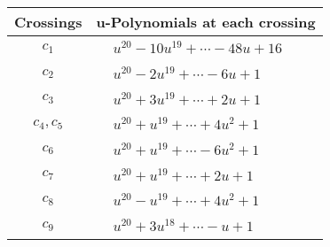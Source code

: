 \documentclass[1p]{elsarticle_modified}
\theoremstyle{definition}
\begin{document}
\begin{tabular}{m{50pt}|m{274pt}}
Crossings & \hspace{64pt}u-Polynomials at each crossing \\
\hline $$\begin{aligned}c_{1}\end{aligned}$$&$\begin{aligned}
&u^{20}-10 u^{19}+\cdots-48 u+16
\end{aligned}$\\
\hline $$\begin{aligned}c_{2}\end{aligned}$$&$\begin{aligned}
&u^{20}-2 u^{19}+\cdots-6 u+1
\end{aligned}$\\
\hline $$\begin{aligned}c_{3}\end{aligned}$$&$\begin{aligned}
&u^{20}+3 u^{19}+\cdots+2 u+1
\end{aligned}$\\
\hline $$\begin{aligned}c_{4},c_{5}\end{aligned}$$&$\begin{aligned}
&u^{20}+u^{19}+\cdots+4 u^2+1
\end{aligned}$\\
\hline $$\begin{aligned}c_{6}\end{aligned}$$&$\begin{aligned}
&u^{20}+u^{19}+\cdots-6 u^2+1
\end{aligned}$\\
\hline $$\begin{aligned}c_{7}\end{aligned}$$&$\begin{aligned}
&u^{20}+u^{19}+\cdots+2 u+1
\end{aligned}$\\
\hline $$\begin{aligned}c_{8}\end{aligned}$$&$\begin{aligned}
&u^{20}- u^{19}+\cdots+4 u^2+1
\end{aligned}$\\
\hline $$\begin{aligned}c_{9}\end{aligned}$$&$\begin{aligned}
&u^{20}+3 u^{18}+\cdots- u+1
\end{aligned}$\\

\end{tabular}
\end{document}
